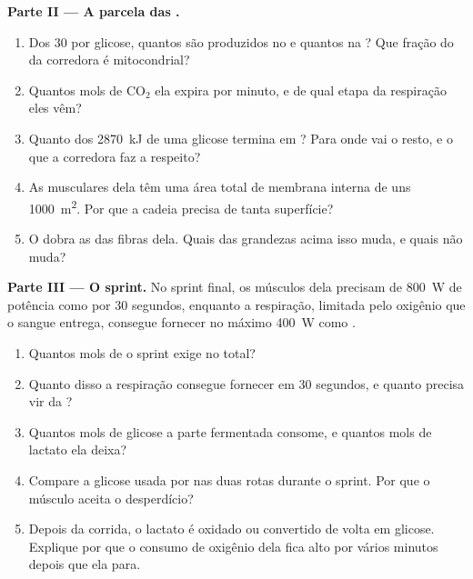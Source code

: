\begin{problem}
\medskip
\noindent\textbf{Parte II --- A parcela das .}
\begin{enumerate}[resume]
  \item Dos 30  por glicose, quantos são produzidos no  e
        quantos na ? Que fração do  da corredora é
        mitocondrial?
  \item Quantos mols de $\mathrm{CO_2}$ ela expira por minuto, e de
        qual etapa da respiração eles vêm?
  \item Quanto dos \qty{2870}{kJ} de uma glicose termina em ? Para
        onde vai o resto, e o que a corredora faz a respeito?
  \item As  musculares dela têm uma área total de membrana
        interna de uns \qty{1000}{m^2}. Por que a cadeia precisa de
        tanta superfície?
  \item O  dobra as  das fibras dela. Quais das
        grandezas acima isso muda, e quais não muda?
\end{enumerate}

\medskip
\noindent\textbf{Parte III --- O sprint.}
No sprint final, os músculos dela precisam de \qty{800}{W} de potência
como  por 30 segundos, enquanto a respiração, limitada pelo oxigênio
que o sangue entrega, consegue fornecer no máximo \qty{400}{W} como .
\begin{enumerate}[resume]
  \item Quantos mols de  o sprint exige no total?
  \item Quanto disso a respiração consegue fornecer em 30 segundos, e
        quanto precisa vir da ?
  \item Quantos mols de glicose a parte fermentada consome, e quantos
        mols de lactato ela deixa?
  \item Compare a glicose usada por  nas duas rotas durante o
        sprint. Por que o músculo aceita o desperdício?
  \item Depois da corrida, o lactato é oxidado ou convertido de volta
        em glicose. Explique por que o consumo de oxigênio dela fica
        alto por vários minutos depois que ela para.
\end{enumerate}


\end{problem}
